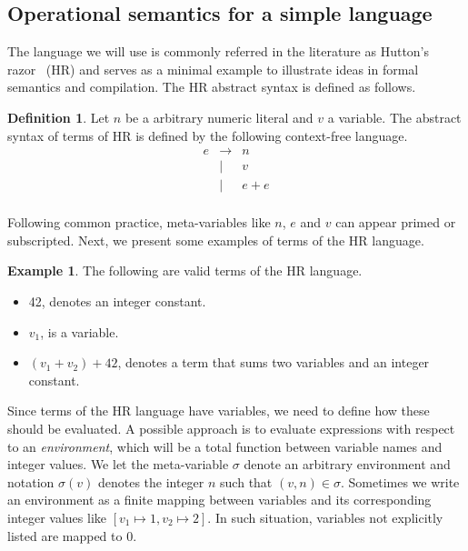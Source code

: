 \documentclass[oneside,12pt]{scrbook}
\theoremstyle{definition}
\newtheorem{Example}{Example}
\theoremstyle{plain}
\theoremstyle{definition}
\newtheorem{Definition}{Definition}
\begin{document}
\subsection{Operational semantics for a simple language}\label{subsection:simplelanguage}

The language we will use is commonly referred in the literature as Hutton's razor~\cite{Hutton98} (HR) and serves as a minimal
example to illustrate ideas in formal semantics and compilation. The HR abstract syntax is defined as follows.

\begin{Definition}
   Let $n$ be a arbitrary numeric literal and $v$ a variable. The abstract syntax of terms of HR is defined by the following
   context-free language.
   \[
      \begin{array}{lcl}
         e & \to  & n \\
           & \mid & v \\
           & \mid & e + e \\
      \end{array}
   \]
 \end{Definition}

Following common practice, meta-variables like $n$, $e$ and $v$ can appear primed or subscripted. Next, we present some
examples of terms of the HR language. 

\begin{Example}
   The following are valid terms of the HR language. 
   \begin{itemize}
     \item 42, denotes an integer constant.
     \item $v_1$, is a variable.
     \item $(v_1 + v_2) + 42$, denotes a term that sums two
      variables and an integer constant.
   \end{itemize}
\end{Example}

Since terms of the HR language have variables, we need to define how these should be evaluated. A possible
approach is to evaluate expressions with respect to an \emph{environment}, which will be a total function
between variable names and integer values. We let the meta-variable $\sigma$ denote an arbitrary environment
and notation $\sigma(v)$ denotes the integer $n$ such that $(v,n) \in \sigma$. Sometimes we write an environment
as a finite mapping between variables and its corresponding integer values like $[v_1 \mapsto 1, v_2 \mapsto 2]$.
In such situation, variables not explicitly listed are mapped to 0.
\end{document}

